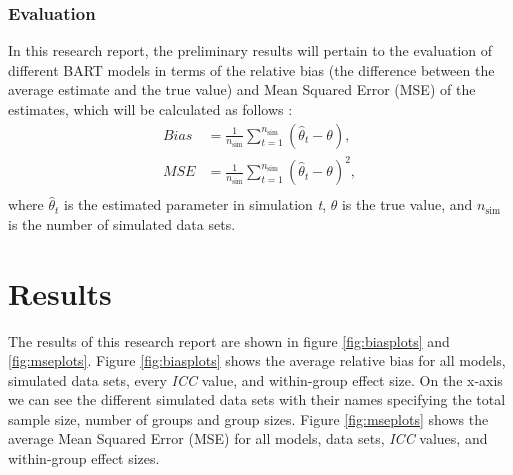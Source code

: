 \documentclass[10pt, a4paper, titlepage]{article}
\begin{document}
\subsubsection{Evaluation}
In this research report, the preliminary results will pertain to the evaluation of different BART models in terms of the relative bias (the difference between the average estimate and the true value) and Mean Squared Error (MSE) of the estimates, which will be calculated as follows \citep{morris2019}:
\begin{subequations}
\label{eq:evaluations}
\begin{align}
Bias &= \frac{1}{n_{\text{sim}}} \sum_{t=1}^{n_{\text{sim}}} (\hat{\theta}_t - \theta), \tag{5} \\
MSE &= \frac{1}{n_{\text{sim}}} \sum_{t=1}^{n_{\text{sim}}} (\hat{\theta}_t - \theta)^{2}, \tag{6} \\
\end{align}
\end{subequations}
where $\hat{\theta}_t$ is the estimated parameter in simulation \textit{t}, $\theta$ is the true value, and $n_{\text{sim}}$ is the number of simulated data sets.

\section{Results}
\graphicspath{{./graphs/}}

The results of this research report are shown in figure \ref{fig:biasplots} and \ref{fig:mseplots}. Figure \ref{fig:biasplots} shows the average relative bias for all models, simulated data sets, every \textit{ICC} value, and within-group effect size. On the x-axis we can see the different simulated data sets with their names specifying the total sample size, number of groups and group sizes. Figure \ref{fig:mseplots} shows the average Mean Squared Error (MSE) for all models, data sets, \textit{ICC} values, and within-group effect sizes.
\end{document}
